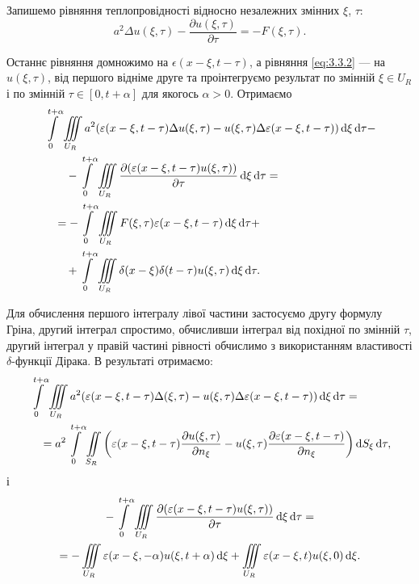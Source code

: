Запишемо рівняння теплопровідності відносно незалежних змінних $\xi$, $\tau$:
\begin{equation}
	a^2 \Delta u(\xi, \tau) - \frac{\partial u(\xi, \tau)}{\partial \tau} = - F(\xi, \tau).
\end{equation}

Останнє рівняння домножимо на $\epsilon(x - \xi, t - \tau)$, а рівняння \eqref{eq:3.3.2} --- на $u(\xi, \tau)$, від першого відніме друге та проінтегруємо результат по змінній $\xi \in U_R$ і по змінній $\tau \in [0, t + \alpha]$ для якогось $\alpha > 0$. Отримаємо
\begin{equation}
	\begin{aligned}
		& \Int_0^{t + \alpha} \Iiint_{U_R} a^2 (\epsilon(x - \xi, t - \tau) \Delta u(\xi, \tau) - u(\xi, \tau) \Delta \epsilon(x - \xi, t - \tau)) \diff \xi \diff \tau - \\
		& \qquad - \Int_0^{t + \alpha} \Iiint_{U_R} \frac{\partial (\epsilon(x - \xi, t - \tau) u(\xi, \tau))}{\partial \tau} \diff \xi \diff \tau = \\
		& \quad = - \Int_0^{t + \alpha} \Iiint_{U_R} F(\xi, \tau) \epsilon(x - \xi, t - \tau) \diff \xi \diff \tau + \\
		& \qquad + \Int_0^{t + \alpha} \Iiint_{U_R} \delta(x - \xi) \delta(t - \tau) u(\xi, \tau) \diff \xi \diff \tau.
	\end{aligned}
\end{equation}


Для обчислення першого інтегралу лівої частини застосуємо другу формулу Гріна, другий інтеграл спростимо, обчисливши інтеграл від похідної по змінній $\tau$, другий інтеграл у правій частині рівності обчислимо з використанням властивості $\delta$-функції Дірака. В результаті отримаємо:
\begin{equation}
	\begin{aligned}
		& \displaystyle\int\limits_0^{t + \alpha} \displaystyle\iiint\limits_{U_R} a^2 (\varepsilon(x - \xi, t - \tau) \Delta(\xi, \tau) - u(\xi, \tau) \Delta \varepsilon(x - \xi, t - \tau)) \mathop{}\!\mathrm{d} \xi \mathop{}\!\mathrm{d} \tau = \\
		& \quad = a^2 \displaystyle\int\limits_0^{t + \alpha} \displaystyle\iint\limits_{S_R} \left( \varepsilon(x - \xi, t - \tau) \frac{\partial u(\xi, \tau)}{\partial n_\xi} - u(\xi, \tau) \frac{\partial \varepsilon(x - \xi, t - \tau)}{\partial n_\xi} \right) \mathop{}\!\mathrm{d} S_\xi \mathop{}\!\mathrm{d} \tau,
	\end{aligned}
\end{equation}
і
\begin{multline}
	- \displaystyle\int\limits_0^{t + \alpha} \displaystyle\iiint\limits_{U_R} \frac{\partial (\varepsilon(x - \xi, t - \tau) u(\xi, \tau))}{\partial \tau} \mathop{}\!\mathrm{d} \xi \mathop{}\!\mathrm{d} \tau = \\
	= - \displaystyle\iiint\limits_{U_R} \varepsilon(x - \xi, -\alpha) u(\xi, t + \alpha) \mathop{}\!\mathrm{d} \xi + \displaystyle\iiint\limits_{U_R} \varepsilon(x - \xi, t) u(\xi, 0) \mathop{}\!\mathrm{d} \xi.
\end{multline}


